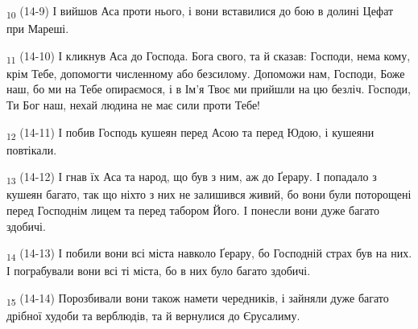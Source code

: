 \begin{tcolorbox}
\textsubscript{10} (14-9) І вийшов Аса проти нього, і вони вставилися до бою в долині Цефат при Мареші.
\end{tcolorbox}
\begin{tcolorbox}
\textsubscript{11} (14-10) І кликнув Аса до Господа. Бога свого, та й сказав: Господи, нема кому, крім Тебе, допомогти численному або безсилому. Допоможи нам, Господи, Боже наш, бо ми на Тебе опираємося, і в Ім'я Твоє ми прийшли на цю безліч. Господи, Ти Бог наш, нехай людина не має сили проти Тебе!
\end{tcolorbox}
\begin{tcolorbox}
\textsubscript{12} (14-11) І побив Господь кушеян перед Асою та перед Юдою, і кушеяни повтікали.
\end{tcolorbox}
\begin{tcolorbox}
\textsubscript{13} (14-12) І гнав їх Аса та народ, що був з ним, аж до Ґерару. І попадало з кушеян багато, так що ніхто з них не залишився живий, бо вони були поторощені перед Господнім лицем та перед табором Його. І понесли вони дуже багато здобичі.
\end{tcolorbox}
\begin{tcolorbox}
\textsubscript{14} (14-13) І побили вони всі міста навколо Ґерару, бо Господній страх був на них. І пограбували вони всі ті міста, бо в них було багато здобичі.
\end{tcolorbox}
\begin{tcolorbox}
\textsubscript{15} (14-14) Порозбивали вони також намети чередників, і зайняли дуже багато дрібної худоби та верблюдів, та й вернулися до Єрусалиму.
\end{tcolorbox}

